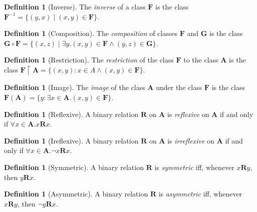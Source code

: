 \documentclass{report}
\theoremstyle{definition}
\newtheorem{definition}[axiom]{Definition}
\begin{document}
    \begin{definition}[Inverse]
        The \emph{inverse} of a class $\mathbf{F}$ is the class $\mathbf{F}^{-1} = \{ (y,x)
        \mid (x,y) \in \mathbf{F} \}$.
    \end{definition}

    \begin{definition}[Composition]
        The \emph{composition} of classes $\mathbf{F}$ and $\mathbf{G}$ is the class
        $\mathbf{G} \circ \mathbf{F} = \{ (x,z) \mid \exists y. (x,y) \in \mathbf{F} \wedge (y,z) \in \mathbf{G} \}$.
    \end{definition}

    \begin{definition}[Restriction]
        The \emph{restriction} of the class $\mathbf{F}$ to the class $\mathbf{A}$ is the class
        $\mathbf{F} \restriction \mathbf{A} = \{ (x,y) : x \in A \wedge (x,y) \in \mathbf{F} \}$.
    \end{definition}

    \begin{definition}[Image]
        The \emph{image} of the class $\mathbf{A}$ under the class $\mathbf{F}$ is the class
        $\mathbf{F}(\mathbf{A}) = \{ y : \exists x \in \mathbf{A}. (x,y) \in \mathbf{F} \}$.
    \end{definition}
    
    \begin{definition}[Reflexive]
        A binary relation $\mathbf{R}$ on $\mathbf{A}$ is \emph{reflexive} on $\mathbf{A}$ if and only if
        $\forall x \in \mathbf{A}. x\mathbf{R}x$.
    \end{definition}

    \begin{definition}[Ireflexive]
        A binary relation $\mathbf{R}$ on $\mathbf{A}$ is \emph{irreflexive} on $\mathbf{A}$ if and only if
        $\forall x \in \mathbf{A}. \neg x\mathbf{R}x$.
    \end{definition}

    \begin{definition}[Symmetric]
        A binary relation $\mathbf{R}$ is \emph{symmetric} iff, whenever $x\mathbf{R}y$, then $y\mathbf{R}x$.
    \end{definition}

    \begin{definition}[Asymmetric]
        A binary relation $\mathbf{R}$ is \emph{asymmetric} iff, whenever $x\mathbf{R}y$, then $\neg y\mathbf{R}x$.
    \end{definition}
\end{document}
